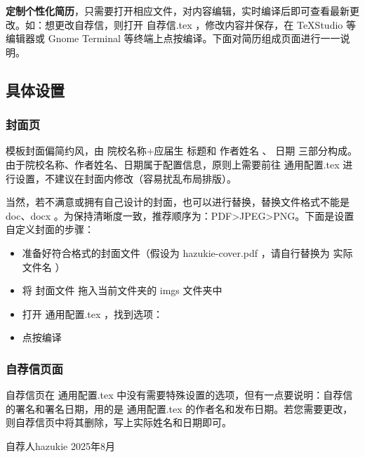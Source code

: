 \documentclass[a4paper,12pt]{ctexart}
\newenvironment{pul}[1]{
	\begin{itemize}[topsep=0pt,labelsep=.5em,leftmargin=\the\dimexpr 0.5em+ #1\relax,itemsep=0em,parsep=.5em]
	}{\end{itemize}}
\newcommand{\emp}[1]{
	\colorbox{spanbg}{#1}
}
\begin{document}
	\textbf{定制个性化简历}，只需要打开相应文件，对内容编辑，实时编译后即可查看最新更改。如：想更改自荐信，则打开 \emp{自荐信.tex}，修改内容并保存，在\emp{TeXStudio}等编辑器或\emp{Gnome Terminal}等终端上点按编译。下面对简历组成页面进行一一说明。
	
	\subsection{具体设置}
	\subsubsection{封面页}
	模板封面偏简约风，由\emp{院校名称+应届生}标题和\emp{作者姓名}、\emp{日期}三部分构成。由于院校名称、作者姓名、日期属于配置信息，原则上需要前往\emp{通用配置.tex}进行设置，不建议在封面内修改（容易扰乱布局排版）。
	\begin{latexcode}
	\def\theUniversityName{大学名}  %
	\def\theCollegeName{学院名}  %
	\def\theSession{xxxx届}  %
	\def\theAuthorName{你的姓名}  %
	\def\theReleaseDate{发布日期} %
	\end{latexcode}
	
	当然，若不满意或拥有自己设计的封面，也可以进行替换，替换文件格式不能是\emp{doc、docx}。为保持清晰度一致，推荐顺序为：PDF>JPEG>PNG。下面是设置自定义封面的步骤：
	\begin{pul}{2em}
	\item 准备好符合格式的封面文件（假设为\emp{hazukie-cover.pdf}，请自行替换为\emp{实际文件名}）
	\item  将\emp{封面文件}拖入当前文件夹的\emp{imgs}文件夹中
	\item 打开\emp{通用配置.tex}，找到选项：
		\begin{latexcode}
	\def\theCoverPageNeed{true} %
	\def\theCoverPageCustomNeed{true}  
	\def\theCoverPageCustomPath{imgs/hazukie-cover.pdf}  
	\def\theCoverPageCustomScale{1} %
	
		\end{latexcode}
	\item 点按编译
	\end{pul}
	\subsubsection{自荐信页面}
	自荐信页在\emp{通用配置.tex}中没有需要特殊设置的选项，但有一点要说明：自荐信的署名和署名日期，用的是\emp{通用配置.tex}的作者名和发布日期。若您需要更改，则自荐信页中将其删除，写上实际姓名和日期即可。
	\begin{latexcode}
	\begin{flushright}
		自荐人\quad hazukie
		2025年8月
	\end{flushright}
	\end{latexcode}
	
\end{document}
